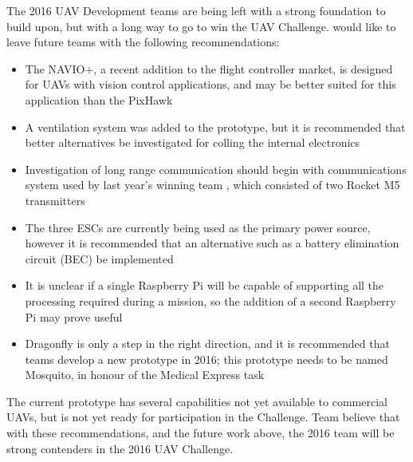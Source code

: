 The 2016 UAV Development teams are being left with a strong foundation to build upon, but with a long way to go to win the UAV Challenge. \ID would like to leave future teams with the following recommendations:

\begin{itemize}
	\item The NAVIO+\cite{ref:navio}, a recent addition to the flight controller market, is designed for UAVs with vision control applications, and may be better suited for this application than the PixHawk
	\item A ventilation system was added to the prototype, but it is recommended that better alternatives be investigated for colling the internal electronics
	\item Investigation of long range communication should begin with communications system used by last year's winning team \cite{ref:2014winners}, which consisted of two Rocket M5 transmitters \cite{ref:rocket}
	\item The three ESCs are currently being used as the primary power source, however it is recommended that an alternative such as a battery elimination circuit (BEC) be implemented
	\item It is unclear if a single Raspberry Pi will be capable of supporting all the processing required during a mission, so the addition of a second Raspberry Pi may prove useful
	\item Dragonfly is only a step in the right direction, and it is recommended that teams develop a new prototype in 2016; this prototype needs to be named Mosquito, in honour of the Medical Express task
\end{itemize}

The current prototype has several capabilities not yet available to commercial UAVs, but is not yet ready for participation in the Challenge. Team \ID believe that with these recommendations, and the future work above, the 2016 team will be strong contenders in the 2016 UAV Challenge.